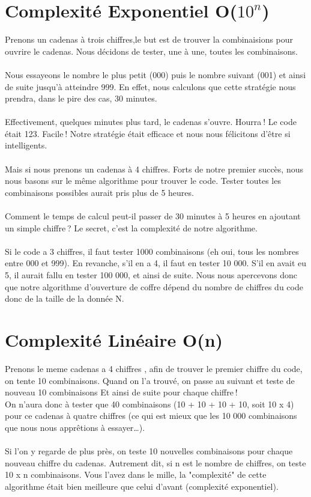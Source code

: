 \documentclass[a4paper,12pt,openany]{book}
\begin{document}
{\section{Complexité Exponentiel O($10^n$)}

Prenons un cadenas à trois chiffres,le but est de trouver la combinaisions pour ouvrire le cadenas. Nous décidons de tester, une à une, toutes les combinaisons.\\
\\
Nous essayeons le nombre le plus petit (000) puis le nombre suivant (001) et ainsi de suite jusqu’à atteindre 999. En effet, nous calculons que cette stratégie nous prendra, dans le pire des cas, 30 minutes.\\
\\
Effectivement, quelques minutes plus tard, le cadenas s’ouvre. Hourra ! Le code était 123. Facile ! Notre stratégie était efficace et nous nous félicitons d’être si intelligents.\\
\\
Mais si nous prenons un cadenas à 4 chiffres. Forts de notre premier succès, nous nous basons sur le même algorithme pour trouver le code. Tester toutes les combinaisons possibles aurait pris plus de 5 heures.\\
\\
Comment le temps de calcul peut-il passer de 30 minutes à 5 heures en ajoutant un simple chiffre ? Le secret, c’est la complexité de notre algorithme.\\
\\
Si le code a 3 chiffres, il faut tester 1000 combinaisons (eh oui, tous les nombres entre 000 et 999). En revanche, s’il en a 4, il faut en tester 10 000. S’il en avait eu 5, il aurait fallu en tester 100 000, et ainsi de suite. Nous nous apercevons donc que notre algorithme d’ouverture de coffre dépend du nombre de chiffres du code donc de la taille de la donnée N.\\

\section{Complexité Linéaire O(n)}

Prenons le meme cadenas a 4 chiffres , afin de trouver le premier chiffre du code, on tente 10 combinaisons. Quand on l’a trouvé, on passe au suivant et teste de nouveau 10 combinaisons Et ainsi de suite pour chaque chiffre !\\
On n’aura donc à tester que 40 combinaisons (10 + 10 + 10 + 10, soit 10 x 4) pour ce cadenas à quatre chiffres (ce qui est mieux que les 10 000 combinaisons que nous nous apprêtions à essayer…).\\
\\
Si l’on y regarde de plus près, on teste 10 nouvelles combinaisons pour chaque nouveau chiffre du cadenas. Autrement dit, si n
est le nombre de chiffres, on teste 10 x n combinaisons. Vous l’avez dans le mille, la "complexité" de cette algorithme était bien meilleure que celui d'avant (complexité exponentiel).\\

}
\end{document}
